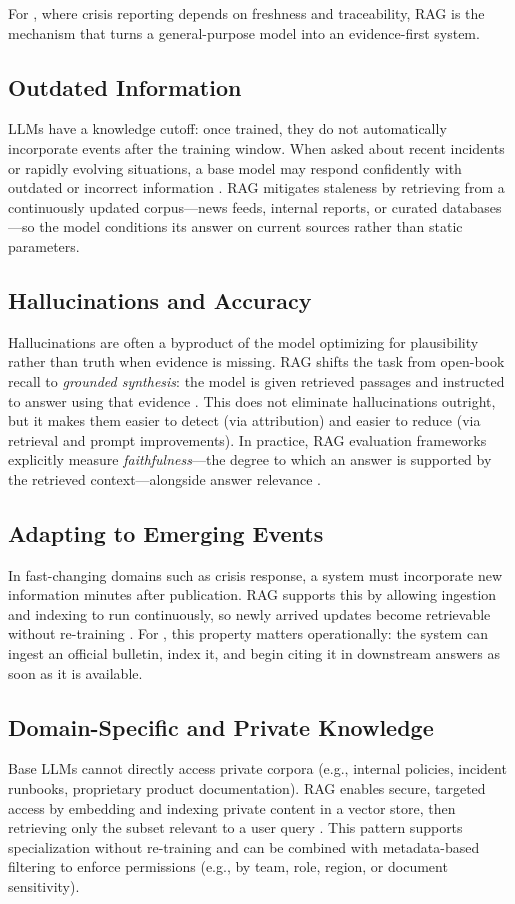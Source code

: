 For \ishtar{}, where crisis reporting depends on freshness and traceability, RAG is the mechanism that turns a general-purpose model into an evidence-first system.

\subsection{Outdated Information}
LLMs have a knowledge cutoff: once trained, they do not automatically incorporate events after the training window. When asked about recent incidents or rapidly evolving situations, a base model may respond confidently with outdated or incorrect information \cite{Lewis2020RAG,Pinecone2023RAG}. RAG mitigates staleness by retrieving from a continuously updated corpus—news feeds, internal reports, or curated databases—so the model conditions its answer on current sources rather than static parameters.

\subsection{Hallucinations and Accuracy}
Hallucinations are often a byproduct of the model optimizing for plausibility rather than truth when evidence is missing. RAG shifts the task from open-book recall to \emph{grounded synthesis}: the model is given retrieved passages and instructed to answer using that evidence \cite{Lewis2020RAG,Izacard2020Fusion}. This does not eliminate hallucinations outright, but it makes them easier to detect (via attribution) and easier to reduce (via retrieval and prompt improvements). In practice, RAG evaluation frameworks explicitly measure \emph{faithfulness}—the degree to which an answer is supported by the retrieved context—alongside answer relevance \cite{ragas_eacl2024}.

\subsection{Adapting to Emerging Events}
In fast-changing domains such as crisis response, a system must incorporate new information minutes after publication. RAG supports this by allowing ingestion and indexing to run continuously, so newly arrived updates become retrievable without re-training \cite{Nakano2021WebGPT,Asai2020MultiHop}. For \ishtar{}, this property matters operationally: the system can ingest an official bulletin, index it, and begin citing it in downstream answers as soon as it is available.

\subsection{Domain-Specific and Private Knowledge}
Base LLMs cannot directly access private corpora (e.g., internal policies, incident runbooks, proprietary product documentation). RAG enables secure, targeted access by embedding and indexing private content in a vector store, then retrieving only the subset relevant to a user query \cite{Johnson2019FAISS,Pinecone2023RAG}. This pattern supports specialization without re-training and can be combined with metadata-based filtering to enforce permissions (e.g., by team, role, region, or document sensitivity).


